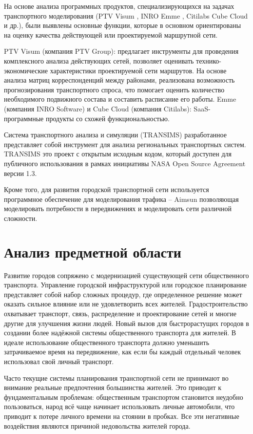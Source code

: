 На основе анализа программных продуктов, специализирующихся на задачах транспортного моделирования 
(PTV Visum \cite{bib:6}, INRO Emme \cite{bib:7}, Citilabs Cube Cloud \cite{bib:8} и др.), были выявлены 
основные функции, которые в основном ориентированы на оценку качества действующей или проектируемой 
маршрутной сети.

PTV Visum (компания PTV Group): предлагает инструменты для проведения комплексного анализа действующих 
сетей, позволяет оценивать технико-экономические характеристики проектируемой сети маршрутов. На основе 
анализа матриц корреспонденций между районами, реализована возможность прогнозирования транспортного спроса, 
что помогает оценить количество необходимого подвижного состава и составить расписание его работы. 
Emme (компания INRO Software) и Cube Cloud (компания Citilabs): SaaS-программные продукты со схожей 
функциональностью.

Система транспортного анализа и симуляции (TRANSIMS) разработанное \cite{transims} представляет собой 
инструмент для анализа региональных транспортных систем. TRANSIMS это проект с открытым исходным кодом, 
который доступен для публичного использования в рамках инициативы NASA Open Source Agreement версии 1.3.

Кроме того, для развития городской транспортной сети используется программное обеспечение для моделирования 
трафика -- Aimsun позволяющая моделировать потребности в передвижениях и моделировать сети различной 
сложности\cite{aimsun}.

\section{Анализ предметной области}
Развитие городов сопряжено с модернизацией существующей сети общественного транспорта. Управление городской 
инфраструктурой или городское планирование представляет собой набор сложных процедур, где определенное 
решение может оказать сильное влияние или не удовлетворить всех жителей. Градостроительство охватывает 
транспорт, связь, распределение и проектирование сетей и многие другие для улучшения жизни людей. Новый 
вызов для быстрорастущих городов в создании более надёжной системы общественного транспорта для жителей. 
В идеале использование общественного транспорта должно уменьшить затрачиваемое время на передвижение, как 
если бы каждый отдельный человек использовал свой личный транспорт.

Часто текущие системы планирования транспортной сети не принимают во внимание реальные предпочтения 
большинства жителей. Это приводит к фундаментальным проблемам: общественным транспортом становится неудобно 
пользоваться, народ всё чаще начинает использовать личные автомобили, что приводит к потере личного времени 
на стоянии в пробках. Все эти негативные воздействия являются причиной недовольства жителей города.

